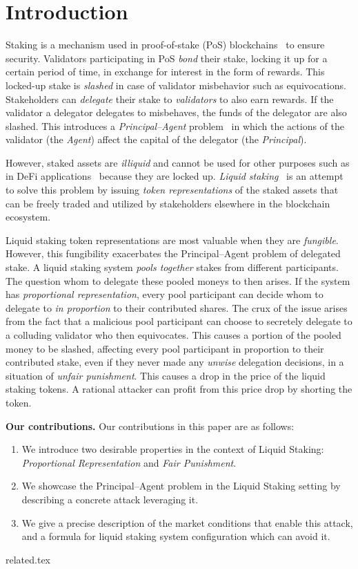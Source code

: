 \section{Introduction}

Staking is a mechanism used in proof-of-stake (PoS)
blockchains~\cite{2018tendermint,buchman2016tendermint,ouroboros,algorand,casper}
to ensure security. Validators participating in PoS
\emph{bond} their stake, locking it up for a certain period of time,
in exchange for interest in the form of rewards.
This locked-up stake is \emph{slashed} in case of validator misbehavior
such as equivocations.
Stakeholders can \emph{delegate} their stake to \emph{validators} to also
earn rewards. If the validator a delegator delegates to misbehaves,
the funds of the delegator are also slashed. This introduces a
\emph{Principal--Agent} problem~\cite{jensen1976,wealthofnations}
in which the actions of the validator (the \emph{Agent})
affect the capital of the delegator (the \emph{Principal}).

However, staked assets are \emph{illiquid} and cannot be used for
other purposes such as in DeFi applications~\cite{defi-sok}
because they are locked up.
\emph{Liquid staking}~\cite{liquid-staking-report}
is an attempt to solve this problem by issuing
\emph{token representations} of the staked assets that can be freely traded
and utilized by stakeholders elsewhere in the blockchain ecosystem.

Liquid staking token representations are most valuable when they are
\emph{fungible}. However, this fungibility exacerbates the Principal--Agent
problem of delegated stake.
A liquid staking system \emph{pools together} stakes from different participants.
The question whom to delegate these pooled moneys to then arises.
If the system has \emph{proportional representation}, every pool participant
can decide whom to delegate to \emph{in proportion} to their contributed shares.
The crux of the issue arises from the fact
that a malicious pool participant can choose to secretely delegate to
a colluding validator who then equivocates. This causes a portion
of the pooled money to be slashed, affecting every pool participant
in proportion to their contributed stake, even if they never made
any \emph{unwise} delegation decisions, in a situation of
\emph{unfair punishment}. This causes a drop in the price of the
liquid staking tokens. A rational attacker can profit from this price
drop by shorting the token.

\noindent
\textbf{Our contributions.} Our contributions in this paper are as follows:
\begin{enumerate}
    \item We introduce two desirable properties in the context of Liquid Staking: \emph{Proportional Representation} and \emph{Fair Punishment}.
    \item We showcase the Principal--Agent problem in the Liquid Staking setting by describing a concrete attack leveraging it.
    \item We give a precise description of the market conditions that enable this attack, and a formula for liquid staking system configuration which can avoid it.
\end{enumerate}

{related.tex}
